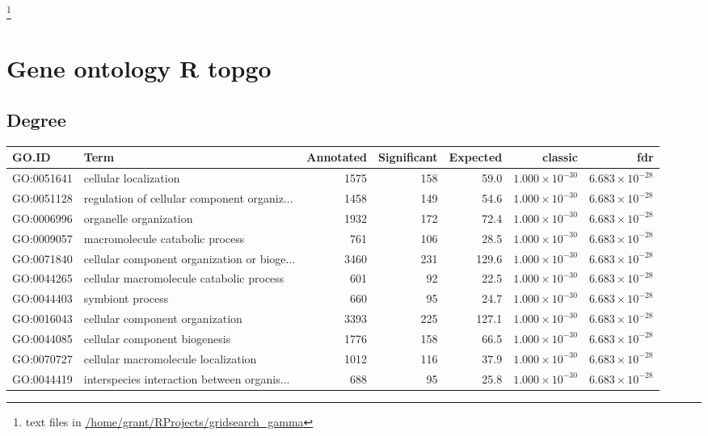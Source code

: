 \footnote{text files in \url{/home/grant/RProjects/gridsearch_gamma}}

\section{Gene ontology R topgo}
\cite{alexa2009gene}
\subsection{Degree}

\begin{table}[ht]
\centering
\begin{adjustbox}{max width=\textwidth}
\begin{tabular}{llrrrrr}
  \hline
GO.ID & Term & Annotated & Significant & Expected & classic & fdr \\ 
  \hline
GO:0051641 & cellular localization & 1575 & 158 & 59.0 & $1.000 \times 10^{-30}$ & $6.683 \times 10^{-28}$ \\ 
  GO:0051128 & regulation of cellular component organiz... & 1458 & 149 & 54.6 & $1.000 \times 10^{-30}$ & $6.683 \times 10^{-28}$ \\ 
  GO:0006996 & organelle organization & 1932 & 172 & 72.4 & $1.000 \times 10^{-30}$ & $6.683 \times 10^{-28}$ \\ 
  GO:0009057 & macromolecule catabolic process & 761 & 106 & 28.5 & $1.000 \times 10^{-30}$ & $6.683 \times 10^{-28}$ \\ 
  GO:0071840 & cellular component organization or bioge... & 3460 & 231 & 129.6 & $1.000 \times 10^{-30}$ & $6.683 \times 10^{-28}$ \\ 
  GO:0044265 & cellular macromolecule catabolic process & 601 & 92 & 22.5 & $1.000 \times 10^{-30}$ & $6.683 \times 10^{-28}$ \\ 
  GO:0044403 & symbiont process & 660 & 95 & 24.7 & $1.000 \times 10^{-30}$ & $6.683 \times 10^{-28}$ \\ 
  GO:0016043 & cellular component organization & 3393 & 225 & 127.1 & $1.000 \times 10^{-30}$ & $6.683 \times 10^{-28}$ \\ 
  GO:0044085 & cellular component biogenesis & 1776 & 158 & 66.5 & $1.000 \times 10^{-30}$ & $6.683 \times 10^{-28}$ \\ 
  GO:0070727 & cellular macromolecule localization & 1012 & 116 & 37.9 & $1.000 \times 10^{-30}$ & $6.683 \times 10^{-28}$ \\ 
  GO:0044419 & interspecies interaction between organis... & 688 & 95 & 25.8 & $1.000 \times 10^{-30}$ & $6.683 \times 10^{-28}$ \\ 

\end{tabular}
\end{adjustbox}
\end{table}
